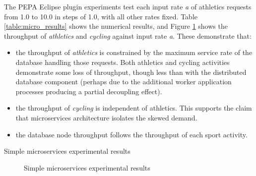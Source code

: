 The PEPA Eclipse plugin experiments test each input rate {\itshape a} of athletics requests from 1.0 to 10.0 in steps of 1.0, with all other rates fixed.  Table \ref{table:micro_results} shows the numerical results, and Figure \ref{figure:micro_charts} shows the throughput of {\itshape athletics} and {\itshape cycling} against input rate {\itshape a}.
These demonstrate that:
\begin{itemize}
	\item the throughput of {\itshape athletics} is constrained by the maximum service rate of the database handling those requests. Both athletics and cycling activities demonstrate some loss of throughput, though less than with the distributed database component (perhaps due to the additional worker application processes producing a partial decoupling effect).
	\item the throughput of {\itshape cycling} is independent of athletics.  This supports the claim that microservices architecture isolates the skewed demand.
	\item the database node throughput follows the throughput of each sport activity.
\end{itemize}

\begin{table}[h!]
	\centering
	\caption{Simple microservices experimental results}
	\label{table:micro_results}
\end{table}

\begin{figure}
	\centering
	\caption{Simple microservices experimental results}
	\label{figure:micro_charts}
\end{figure}

